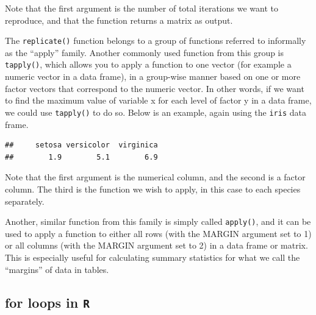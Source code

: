 \documentclass[]{book}
\newenvironment{Shaded}{\begin{snugshade}}{\end{snugshade}}
\newcommand{\CommentTok}[1]{\textcolor[rgb]{0.56,0.35,0.01}{\textit{#1}}}
\newcommand{\KeywordTok}[1]{\textcolor[rgb]{0.13,0.29,0.53}{\textbf{#1}}}
\newcommand{\NormalTok}[1]{#1}
\newcommand{\OperatorTok}[1]{\textcolor[rgb]{0.81,0.36,0.00}{\textbf{#1}}}
\begin{document}
Note that the first argument is the number of total iterations we want to reproduce, and that the function returns a matrix as output.

The \texttt{replicate()} function belongs to a group of functions referred to informally as the ``apply'' family. Another commonly used function from this group is \texttt{tapply()}, which allows you to apply a function to one vector (for example a numeric vector in a data frame), in a group-wise manner based on one or more factor vectors that correspond to the numeric vector. In other words, if we want to find the maximum value of variable x for each level of factor y in a data frame, we could use \texttt{tapply()} to do so. Below is an example, again using the \texttt{iris} data frame.

\begin{Shaded}
\end{Shaded}

\begin{verbatim}
##     setosa versicolor  virginica 
##        1.9        5.1        6.9
\end{verbatim}

Note that the first argument is the numerical column, and the second is a factor column. The third is the function we wish to apply, in this case to each species separately.

Another, similar function from this family is simply called \texttt{apply()}, and it can be used to apply a function to either all rows (with the MARGIN argument set to 1) or all columns (with the MARGIN argument set to 2) in a data frame or matrix. This is especially useful for calculating summary statistics for what we call the ``margins'' of data in tables.

\hypertarget{for-loops-in-r}{%
\subsection{\texorpdfstring{for loops in \texttt{R}}{for loops in R}}\label{for-loops-in-r}}
\end{document}
